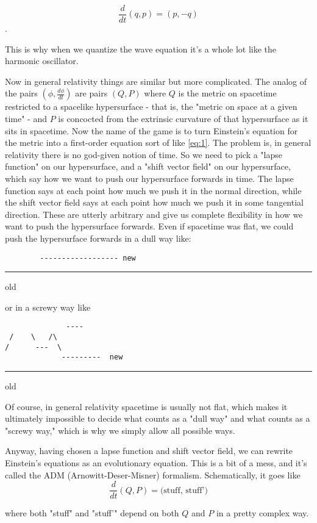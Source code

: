 \[\frac{d}{dt} (q,p) = (p, -q)\].  

This is why when we quantize the wave equation it's a whole lot like the harmonic oscillator.

Now in general relativity things are similar but more complicated. The analog of the pairs $(\phi, \frac{d\phi}{dt})$ are pairs $(Q,P)$ where $Q$ is the metric on spacetime restricted to a spacelike hypersurface - that is, the "metric on space at a given time" - and $P$ is concocted from the extrinsic curvature of that hypersurface as it sits in spacetime. Now the name of the game is to turn Einstein's equation for the metric into a first-order equation sort of like \ref{eq:1}. The problem is, in general relativity there is no god-given notion of time. So we need to pick a "lapse function" on our hypersurface, and a "shift vector field" on our hypersurface, which say how we want to push our hypersurface forwards in time. The lapse function says at each point how much we push it in the normal direction, while the shift vector field says at each point how much we push it in some tangential direction. These are utterly arbitrary and give us complete flexibility in how we want to push the hypersurface forwards. Even if spacetime was flat, we could push the hypersurface forwards in a dull way like:
\begin{verbatim}
        ------------------ new
\end{verbatim}

\quad \quad \quad  \noindent\rule{4cm}{0.4pt} old

or in a screwy way like
\begin{verbatim}
			  ----
 /    \   /\
/      ---  \
             ---------  new
\end{verbatim}
\noindent\rule{5cm}{0.4pt}  old


Of course, in general relativity spacetime is usually not flat, which makes it ultimately impossible to decide what counts as a "dull way" and what counts as a "screwy way," which is why we simply allow all possible ways.

Anyway, having chosen a lapse function and shift vector field, we can rewrite Einstein's equations as an evolutionary equation. This is a bit of a mess, and it's called the ADM (Arnowitt-Deser-Misner) formalism. Schematically, it goes like
\begin{equation}
\tag{2}\label{eq:2}
\frac{d}{dt}(Q,P) = \text{(stuff, stuff')}
\end{equation}

where both "stuff" and "stuff'" depend on both $Q$ and $P$ in a pretty complex way.

